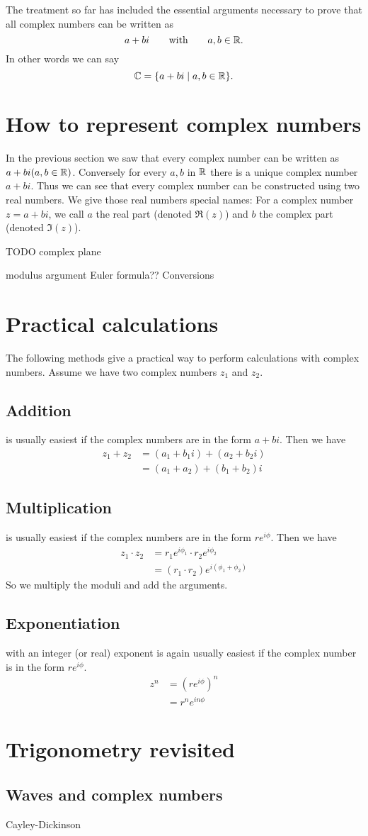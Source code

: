 The treatment so far has included the essential arguments necessary to prove that all complex numbers can be written as
\[a + bi \qquad \text{with} \qquad a,b \in \mathbb{R}.\]
In other words we can say
\[ \mathbb{C} = \{a + bi \; | \; a,b \in \mathbb{R} \}. \]

\section{How to represent complex numbers}
In the previous section we saw that every complex number can be written as $a + bi (a,b \in \mathbb{R})$. Conversely for every $a,b $ in $\mathbb{R}$ there is a unique complex number $a + bi$. Thus we can see that every complex number can be constructed using two real numbers. We give those real numbers special names: For a complex number $z = a + bi$, we call $a$ the real part (denoted $\Re(z)$) and $b$ the complex part (denoted $\Im(z)$).

TODO complex plane

modulus argument
Euler formula??
Conversions

\section{Practical calculations}
The following methods give a practical way to perform calculations with complex numbers. Assume we have two complex numbers $z_1$ and $z_2$. 
\subsection{Addition} is usually easiest if the complex numbers are in the form $a+bi$. Then we have
\begin{align*}
z_1 + z_2 &= (a_1 + b_1i) + (a_2 + b_2i) \\
&= (a_1+a_2) + (b_1+b_2)i
\end{align*} 
\subsection{Multiplication} is usually easiest if the complex numbers are in the form $re^{i\phi}$. Then we have
\begin{align*}
z_1 \cdot z_2 &= r_1e^{i\phi_1}\cdot r_2e^{i\phi_2} \\
&= (r_1\cdot r_2)e^{i(\phi_1+\phi_2)}
\end{align*}
So we multiply the moduli and add the arguments.
\subsection{Exponentiation} with an integer (or real) exponent is again usually easiest if the complex number is in the form $re^{i\phi}$.
\begin{align*}
z^n &= (re^{i\phi})^n \\
&= r^n e^{in\phi}
\end{align*}
\section{Trigonometry revisited}
\subsection{Waves and complex numbers}

Cayley-Dickinson
